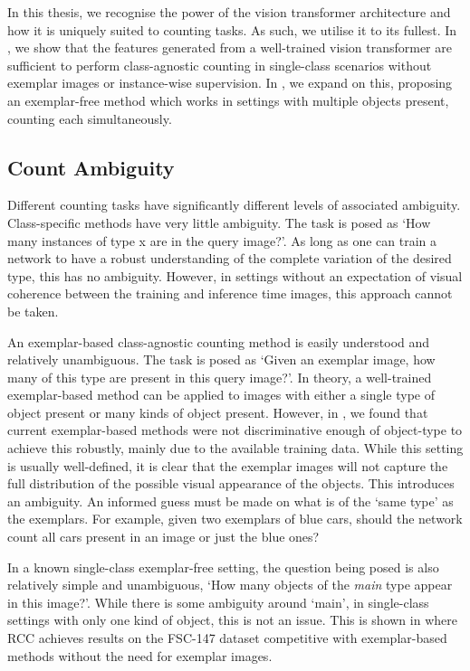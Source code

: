 \documentclass[../thesis.tex]{subfiles}
\begin{document}
In this thesis, we recognise the power of the vision transformer architecture and how it is uniquely suited to counting tasks. 
As such, we utilise it to its fullest.
In , we show that the features generated from a well-trained vision transformer are sufficient to perform class-agnostic counting in single-class scenarios without exemplar images or instance-wise supervision.
In , we expand on this, proposing an exemplar-free method which works in settings with multiple objects present, counting each simultaneously.



\subsection{Count Ambiguity}\label{sec__lit_rev__count_valid_but_unkonwon_counts}
Different counting tasks have significantly different levels of associated ambiguity.
Class-specific methods have very little ambiguity. The task is posed as `How many instances of type x are in the query image?'. 
As long as one can train a network to have a robust understanding of the complete variation of the desired type, this has no ambiguity. However, in settings without an expectation of visual coherence between the training and inference time images, this approach cannot be taken.

An exemplar-based class-agnostic counting method is easily understood and relatively unambiguous. The task is posed as `Given an exemplar image, how many of this type are present in this query image?'. 
In theory, a well-trained exemplar-based method can be applied to images with either a single type of object present or many kinds of object present. However, in , we found that current exemplar-based methods \cite{ranjan2021Famnet,shi2022represent,liu2022countr} were not discriminative enough of object-type to achieve this robustly, mainly due to the available training data.
While this setting is usually well-defined, it is clear that the exemplar images will not capture the full distribution of the possible visual appearance of the objects. This introduces an ambiguity. An informed guess must be made on what is of the `same type' as the exemplars.
For example, given two exemplars of blue cars, should the network count all cars present in an image or just the blue ones?

In a known single-class exemplar-free setting, the question being posed is also relatively simple and unambiguous, `How many objects of the \textit{main} type appear in this image?'. 
While there is some ambiguity around `main', in single-class settings with only one kind of object, this is not an issue. This is shown in  where RCC achieves results on the FSC-147 dataset competitive with exemplar-based methods without the need for exemplar images.
\end{document}
